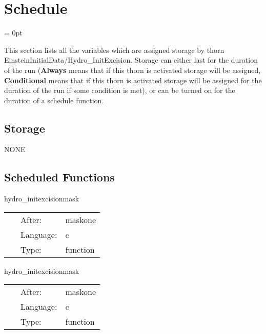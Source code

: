 
\section{Schedule} 


\parskip = 0pt


\noindent This section lists all the variables which are assigned storage by thorn EinsteinInitialData/Hydro\_InitExcision.  Storage can either last for the duration of the run ({\bf Always} means that if this thorn is activated storage will be assigned, {\bf Conditional} means that if this thorn is activated storage will be assigned for the duration of the run if some condition is met), or can be turned on for the duration of a schedule function.


\subsection*{Storage}NONE
\subsection*{Scheduled Functions}
\vspace{5mm}


\hspace{5mm} hydro\_initexcisionmask 

\hspace{5mm}{\it sets up the excision mask } 


\hspace{5mm}

 \begin{tabular*}{160mm}{cll} 
~ & After:  & maskone \\ 
~ & Language:  & c \\ 
~ & Type:  & function \\ 
\end{tabular*} 


\vspace{5mm}


\hspace{5mm} hydro\_initexcisionmask 

\hspace{5mm}{\it sets up the excision mask } 


\hspace{5mm}

 \begin{tabular*}{160mm}{cll} 
~ & After:  & maskone \\ 
~ & Language:  & c \\ 
~ & Type:  & function \\ 
\end{tabular*} 


